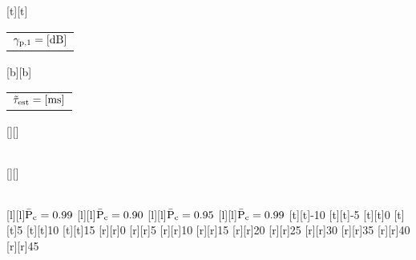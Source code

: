 %    
%
%
%
[t][t]{\fontsize{8}{12}\selectfont \color[rgb]{0,0,0}\setlength{\tabcolsep}{0pt}\begin{tabular}{c}${\gamma}_{\text{p,1}} = [\SI{}{dB}]$\end{tabular}}%
[b][b]{\fontsize{8}{12}\selectfont \color[rgb]{0,0,0}\setlength{\tabcolsep}{0pt}\begin{tabular}{c}$\tilde{\tau}_{\text{est}} = [\SI{}{ms}]$\end{tabular}}%
[][]{\fontsize{10}{15}\selectfont \color[rgb]{0,0,0}\setlength{\tabcolsep}{0pt}\begin{tabular}{c} \end{tabular}}%
[][]{\fontsize{10}{15}\selectfont \color[rgb]{0,0,0}\setlength{\tabcolsep}{0pt}\begin{tabular}{c} \end{tabular}}%
[l][l]{\fontsize{8}{12}\selectfont \color[rgb]{0,0,0}$\bar{\text{P}}_{\text{c}} = 0.99$}%
[l][l]{\fontsize{8}{12}\selectfont \color[rgb]{0,0,0}$\bar{\text{P}}_{\text{c}} = 0.90$}%
[l][l]{\fontsize{8}{12}\selectfont \color[rgb]{0,0,0}$\bar{\text{P}}_{\text{c}} = 0.95$}%
[l][l]{\fontsize{8}{12}\selectfont \color[rgb]{0,0,0}$\bar{\text{P}}_{\text{c}} = 0.99$}%
%
\fontsize{8}{12}%
\selectfont%
%
[t][t]{-10}%
[t][t]{-5}%
[t][t]{0}%
[t][t]{5}%
[t][t]{10}%
[t][t]{15}%
%
[r][r]{0}%
[r][r]{5}%
[r][r]{10}%
[r][r]{15}%
[r][r]{20}%
[r][r]{25}%
[r][r]{30}%
[r][r]{35}%
[r][r]{40}%
[r][r]{45}%
%
%
